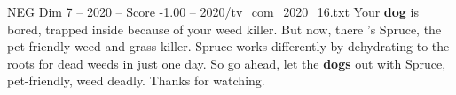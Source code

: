\begin{textsample}{NEG Dim 7 – 2020 – Score -1.00 – 2020/tv\_com\_2020\_16.txt}  \label{ex:f7_neg_005}
Your \textbf{dog} is bored, trapped inside because of your weed killer.
But now, there 's Spruce, the pet-friendly weed and grass killer.
Spruce works differently by dehydrating to the roots for dead weeds in just one day.
So go ahead, let the \textbf{dogs} out with Spruce, pet-friendly, weed deadly.
Thanks for watching.

\end{textsample}
